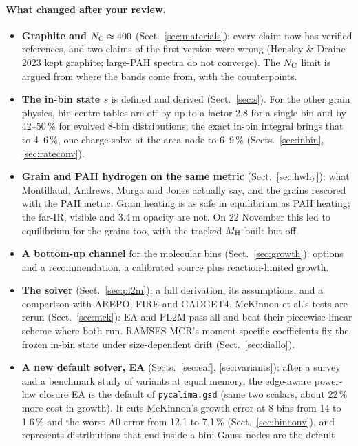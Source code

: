 \documentclass[11pt,a4paper]{article}
\newcommand{\NC}{N_{\rm C}}
\newcommand{\MH}{M_{\rm H}}
\begin{document}
\paragraph{What changed after your review.}
\begin{itemize}
\item \textbf{Graphite and $\NC\approx400$} (Sect.~\ref{sec:materials}): every claim now has verified references, and
  two claims of the first version were wrong (Hensley \& Draine 2023 kept graphite; large-PAH spectra do not
  converge). The $\NC$ limit is argued from where the bands come from, with the counterpoints.
\item \textbf{The in-bin state $s$} is defined and derived (Sect.~\ref{sec:s}). For the other grain physics, bin-centre
  tables are off by up to a factor 2.8 for a single bin and by 42--50\,\% for evolved 8-bin distributions; the exact
  in-bin integral brings that to 4--6\,\%, one charge solve at the area node to 6--9\,\%
  (Sects.~\ref{sec:inbin}, \ref{sec:rateconv}).
\item \textbf{Grain and PAH hydrogen on the same metric} (Sect.~\ref{sec:hwhy}): what Montillaud, Andrews, Murga and
  Jones actually say, and the grains rescored with the PAH metric. Grain heating is as safe in equilibrium as PAH
  heating; the far-IR, visible and 3.4\,\textmu m opacity are not. On 22 November this led to equilibrium for the grains
  too, with the tracked $\MH$ built but off.
\item \textbf{A bottom-up channel} for the molecular bins (Sect.~\ref{sec:growth}): options and a recommendation, a
  calibrated source plus reaction-limited growth.
\item \textbf{The solver} (Sect.~\ref{sec:pl2m}): a full derivation, its assumptions, and a comparison with AREPO,
  FIRE and GADGET4. McKinnon et al.'s tests are rerun (Sect.~\ref{sec:mck}): EA and PL2M pass all and beat their
  piecewise-linear scheme where both run. RAMSES-MCR's moment-specific coefficients fix the frozen in-bin state under
  size-dependent drift (Sect.~\ref{sec:diallo}).
\item \textbf{A new default solver, EA} (Sects.~\ref{sec:eaf}, \ref{sec:variants}): after a survey and a benchmark
  study of variants at equal memory, the edge-aware power-law closure EA is the default of \texttt{pycalima.gsd} (same
  two scalars, about 22\,\% more cost in growth). It cuts McKinnon's growth error at 8 bins from 14 to 1.6\,\% and the
  worst A0 error from 12.1 to 7.1\,\% (Sect.~\ref{sec:binconv}), and represents distributions that end inside a bin; Gauss nodes are the default

\end{itemize}
\end{document}

